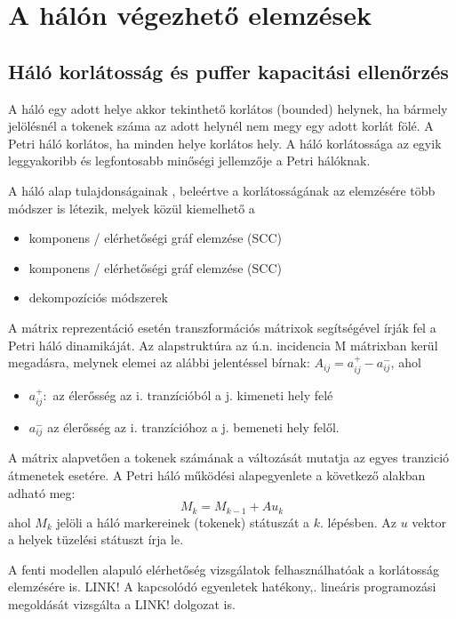 \documentclass[12pt,a4paper]{book}
\begin{document}

\chapter{A hálón végezhető elemzések}
\section{Háló korlátosság és puffer kapacitási ellenőrzés}

A háló egy adott helye akkor tekinthető korlátos (bounded) helynek, ha bármely jelölésnél a tokenek száma az adott helynél nem megy egy adott korlát fölé. A Petri háló korlátos, ha minden helye korlátos hely.
A háló korlátossága az egyik leggyakoribb és legfontosabb minőségi jellemzője a Petri hálóknak. 

A háló alap tulajdonságainak , beleértve a korlátosságának az elemzésére több módszer is létezik, melyek közül kiemelhető a
\begin{itemize}
\item komponens / elérhetőségi gráf elemzése (SCC)
\item komponens / elérhetőségi gráf elemzése (SCC)
\item dekompozíciós módszerek 
\end{itemize}

A mátrix reprezentáció esetén transzformációs mátrixok segítségével írják fel a Petri háló dinamikáját. Az alapstruktúra az ú.n. incidencia M mátrixban kerül megadásra, melynek elemei az alábbi jelentéssel bírnak: $A_{ij}=a^+_{ij}-a^-_{ij}$, ahol 
\begin{itemize}
\item $a^+_{ij}: $ az élerősség az i. tranzícióból a j. kimeneti hely felé
\item $a^-_{ij}$ az élerősség az i. tranzícióhoz a j. bemeneti hely felől.
\end{itemize}

A mátrix alapvetően a tokenek számának a változását mutatja az egyes tranzició átmenetek esetére. A  Petri háló működési alapegyenlete a következő alakban adható meg: 
$$M_k=M_{k-1}+ Au_k$$
ahol $M_k$ jelöli a háló markereinek (tokenek) státuszát a $k.$ lépésben. Az $u$ vektor a helyek tüzelési státuszt írja le. 

A fenti modellen alapuló elérhetőség vizsgálatok felhasználhatóak a korlátosság elemzésére is. LINK!%
A kapcsolódó  egyenletek hatékony,. lineáris programozási megoldását vizsgálta a LINK!  
dolgozat is.
\end{document}
